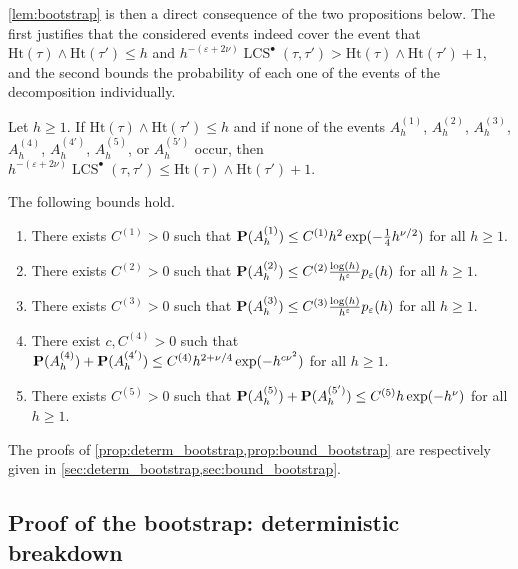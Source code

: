 \documentclass[11pt,reqno]{amsart}
\newcommand{\Ht}{\mathrm{Ht}}
\newcommand{\LCS}{\operatorname{LCS}}
\newcommand{\eps}{\varepsilon}
\begin{document}
\cref{lem:bootstrap} is then a direct consequence of the two propositions below. The first justifies that the considered events indeed cover the event that $\Ht(\tau)\wedge\Ht(\tau')\leq h$ and $h^{-(\eps+2\nu)}\LCS^\bullet(\tau,\tau')> \Ht(\tau)\wedge\Ht(\tau')+1$, and the second bounds the probability of each one of the events of the decomposition individually.

\begin{prop}
\label{prop:determ_bootstrap}
    Let $h\geq 1$. If $\Ht(\tau)\wedge \Ht(\tau')\leq h$ and if none of the events $A_h^{(1)}$, $A_h^{(2)}$, $A_h^{(3)}$, $A_h^{(4)}$, $A_h^{(4')}$, $A_h^{(5)}$, or $A_h^{(5')}$ occur, then $h^{-(\eps+2\nu)}\LCS^\bullet(\tau,\tau')\leq  \Ht(\tau)\wedge\Ht(\tau')+1$. 
\end{prop}

\begin{prop}
\label{prop:bound_bootstrap}
    The following bounds hold.
    \begin{enumerate}
        \item[\emph{(1)}] There exists $C^{(1)} > 0$ such that $\mathbf{P}(A_h^{(1)}) \leq C^{(1)}h^2\exp(-\tfrac{1}{4}h^{\nu/2})$ for all $h \geq 1$.    
        \item[\emph{(2)}] There exists $C^{(2)} > 0$ such that $\mathbf{P}(A_h^{(2)}) \leq C^{(2)}\frac{\log(h)}{h^{\varepsilon}}p_\varepsilon(h)$ for all $h \geq 1$.
        \item[\emph{(3)}] There exists $C^{(3)} > 0$ such that $\mathbf{P}(A_h^{(3)}) \leq C^{(3)}\frac{\log(h)}{h^\varepsilon}p_\varepsilon(h)$ for all $h \geq 1$.
        \item[\emph{(4)}] There exist $c,C^{(4)} > 0$ such that $\mathbf{P}(A_{h}^{(4)})+\mathbf{P}(A_h^{(4')}) \leq C^{(4)}h^{2+\nu/4}\exp(-h^{c\nu^2})$ for all $h \geq 1$.
        \item[\emph{(5)}] There exists $C^{(5)} > 0$ such that $\mathbf{P}(A_h^{(5)})+\mathbf{P}(A_h^{(5')}) \leq C^{(5)}h\exp(-h^{\nu})$ for all $h \geq 1$.    
    \end{enumerate}
\end{prop}

The proofs of \cref{prop:determ_bootstrap,prop:bound_bootstrap} are respectively given in \cref{sec:determ_bootstrap,sec:bound_bootstrap}.


\subsection{Proof of the bootstrap: deterministic breakdown}
\label{sec:determ_bootstrap}
\end{document}
